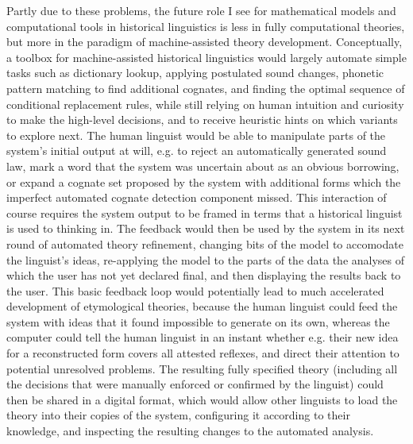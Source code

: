 Partly due to these problems, the future role I see for mathematical models and computational tools in historical linguistics is less in fully computational theories, but more in the paradigm of machine-assisted theory development. Conceptually, a toolbox for machine-assisted historical linguistics would largely automate simple tasks such as dictionary lookup, applying postulated sound changes, phonetic pattern matching to find additional cognates, and finding the optimal sequence of conditional replacement rules, while still relying on human intuition and curiosity to make the high-level decisions, and to receive heuristic hints on which variants to explore next. The human linguist would be able to manipulate parts of the system's initial output at will, e.g. to reject an automatically generated sound law, mark a word that the system was uncertain about as an obvious borrowing, or expand a cognate set proposed by the system with additional forms which the imperfect automated cognate detection component missed. This interaction of course requires the system output to be framed in terms that a historical linguist is used to thinking in. The feedback would then be used by the system in its next round of automated theory refinement, changing bits of the model to accomodate the linguist's ideas, re-applying the model to the parts of the data the analyses of which the user has not yet declared final, and then displaying the results back to the user. This basic feedback loop would potentially lead to much accelerated development of etymological theories, because the human linguist could feed the system with ideas that it found impossible to generate on its own, whereas the computer could tell the human linguist in an instant whether e.g. their new idea for a reconstructed form covers all attested reflexes, and direct their attention to potential unresolved problems. The resulting fully specified theory (including all the decisions that were manually enforced or confirmed by the linguist) could then be shared in a digital format, which would allow other linguists to load the theory into their copies of the system, configuring it according to their knowledge, and inspecting the resulting changes to the automated analysis.

